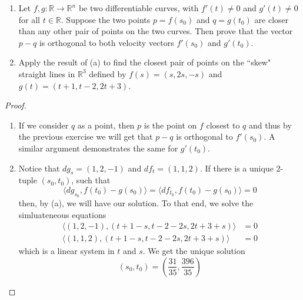 \question \begin{enumerate}[label=\alph*]
    \item Let \( f,g: \mathbb{R} \rightarrow \mathbb{R}^n \) be two differentiable curves, with \( f'(t) \neq 0 \) and \( g'(t) \neq 0 \) for all \( t \in \mathbb{R} \). Suppose the two points \( p = f(s_0) \) and \( q=g(t_0) \) are closer than any other pair of points on the two curves. Then prove that the vector \( p-q \) is orthogonal to both velocity vectors \( f'(s_0) \) and \( g'(t_0) \). 
    
    \item Apply the result of (a) to find the closest pair of points on the ``skew" straight lines in \( \mathbb{R}^3 \) defined by \( f(s) = (s,2s,-s) \) and \( g(t) = (t+1,t-2,2t+3) \).
\end{enumerate}

\begin{proof}
\begin{enumerate}[label=\alph*]
    \item If we consider \( q \) as a point, then \( p \) is the point on \( f \) closest to \( q \) and thus by the previous exercise we will get that \( p-q \) is orthogonal to \( f'(s_0) \). A similar argument demonstrates the same for \( g'(t_0) \).
    
    \item Notice that \( dg_s = (1,2,-1) \) and \( df_t = (1,1,2) \). If there is a unique 2-tuple \( (s_0,t_0) \), such that 
    \[
    \langle dg_{s_{0}},f(t_0)-g(s_0) \rangle = \langle df_{t_0}, f(t_0)-g(s_0) \rangle = 0
    \]
    then, by (a), we will have our solution. To that end, we solve the simluateneous equations
    \[
    \begin{array}{rl}
    \langle (1,2,-1), (t+1-s,t-2-2s,2t+3+s) \rangle &= 0 \\
    \langle (1,1,2), (t+1-s,t-2-2s,2t+3+s) \rangle &= 0
    \end{array}
    \]
    which is a linear system in \( t \) and \( s \). We get the unique solution
    \[
    (s_0,t_0) = \left( \frac{31}{35}, \frac{396}{35} \right)
    \]
\end{enumerate}
\end{proof}

